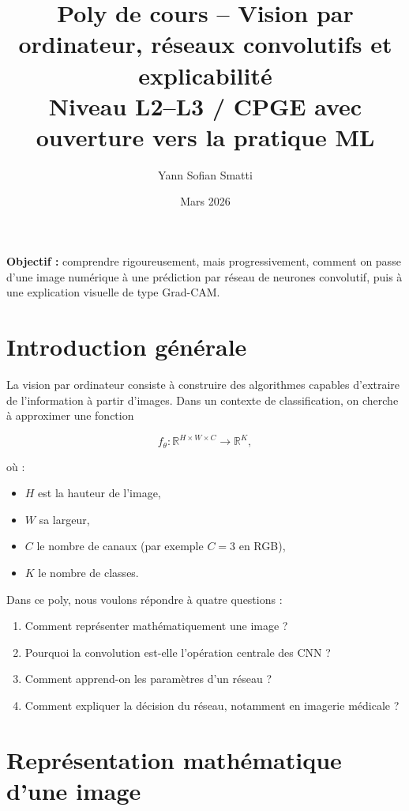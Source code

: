 \documentclass[11pt,a4paper]{article}
\title{\textbf{Poly de cours -- Vision par ordinateur, réseaux convolutifs et explicabilité}\\
\large Niveau L2--L3 / CPGE avec ouverture vers la pratique ML}
\author{Yann Sofian Smatti}
\date{Mars 2026}
\begin{document}
\maketitle

\begin{center}
\textbf{Objectif :} comprendre rigoureusement, mais progressivement, comment on passe d'une image numérique à une prédiction par réseau de neurones convolutif, puis à une explication visuelle de type Grad-CAM.
\end{center}

\tableofcontents
\newpage

\section{Introduction générale}

La vision par ordinateur consiste à construire des algorithmes capables d'extraire de l'information à partir d'images. Dans un contexte de classification, on cherche à approximer une fonction

\[
f_\theta : \mathbb{R}^{H \times W \times C} \to \mathbb{R}^K,
\]

où :
\begin{itemize}
    \item $H$ est la hauteur de l'image,
    \item $W$ sa largeur,
    \item $C$ le nombre de canaux (par exemple $C=3$ en RGB),
    \item $K$ le nombre de classes.
\end{itemize}

Dans ce poly, nous voulons répondre à quatre questions :
\begin{enumerate}[label=\arabic*)]
    \item Comment représenter mathématiquement une image ?
    \item Pourquoi la convolution est-elle l'opération centrale des CNN ?
    \item Comment apprend-on les paramètres d'un réseau ?
    \item Comment expliquer la décision du réseau, notamment en imagerie médicale ?
\end{enumerate}

\section{Représentation mathématique d'une image}
\end{document}
